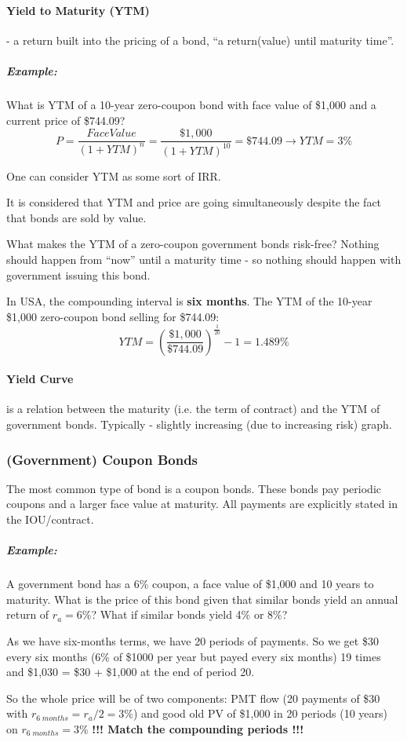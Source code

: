 \documentclass{scrartcl}
\newcommand{\example}{\subparagraph{Example:}} %
\begin{document}
\paragraph{Yield to Maturity (YTM)} - a return built into the pricing of a bond,
``a return(value) until maturity time''. \example What is YTM of a 10-year
zero-coupon bond with face value of \$1,000 and a current price of \$744.09?
$$P=\frac{FaceValue}{(1+YTM)^n} = \frac{\$1,000}{(1+YTM)^{10}} = \$744.09 \to YTM=3\%$$

One can consider YTM as some sort of IRR.

It is considered that YTM and price are going simultaneously despite the fact
that bonds are sold by value.

What makes the YTM of a zero-coupon government bonds risk-free? Nothing should
happen from ``now'' until a maturity time - so nothing should happen with
government issuing this bond.

In USA, the compounding interval is {\bf six months}. The YTM of the 10-year
\$1,000 zero-coupon bond selling for \$744.09:
$$YTM = \left( \frac{\$1,000}{\$744.09}\right)^{\frac1{20}} - 1 = 1.489\%$$

\paragraph{Yield Curve} is a relation between the maturity (i.e. the term of
contract) and the YTM of government bonds. Typically - slightly increasing (due
to increasing risk) graph.

\subsubsection{(Government) Coupon Bonds}
The most common type of bond is a coupon bonds. These bonds pay periodic coupons
and a larger face value at maturity. All payments are explicitly stated in the
IOU/contract.

\example A government bond has a 6\% coupon, a face value of \$1,000 and 10
years to maturity. What is the price of this bond given that similar bonds yield
an annual return of $r_a = 6\%$? What if similar bonds yield 4\% or 8\%?

As we have six-months terms, we have 20 periods of payments. So we get \$30
every six months (6\% of \$1000 per year but payed every six months) 19 times
and \$1,030 = \$30 + \$1,000 at the end of period 20.

So the whole price will be of two components: PMT flow (20 payments of \$30 with
$r_{6\;months} = r_a / 2 = 3\%$) and good old PV of \$1,000 in 20 periods (10
years) on $r_{6\;months}=3\%$ {\bf !!! Match the compounding periods !!!}
\end{document}
